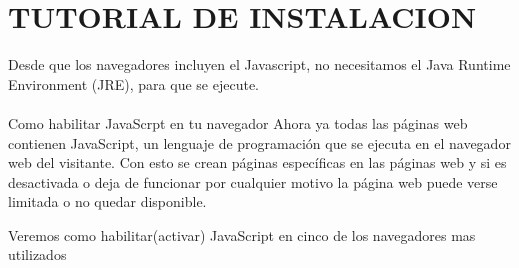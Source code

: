 \documentclass[11pt]{article} %
\begin{document}
\section{TUTORIAL DE INSTALACION}
 Desde que los navegadores incluyen el Javascript, no necesitamos el Java Runtime Environment (JRE), para que se ejecute.
\\  \\
Como habilitar JavaScrpt en tu navegador 
Ahora ya todas las páginas web contienen  JavaScript, un lenguaje de programación que se ejecuta en el navegador web del visitante. Con esto se crean páginas específicas en las páginas web y si es desactivada o deja de funcionar por cualquier motivo la página web puede verse limitada o no quedar disponible.

Veremos como habilitar(activar) JavaScript en cinco de los navegadores mas utilizados



\lstset{language=Pascal}          %
\end{document}
